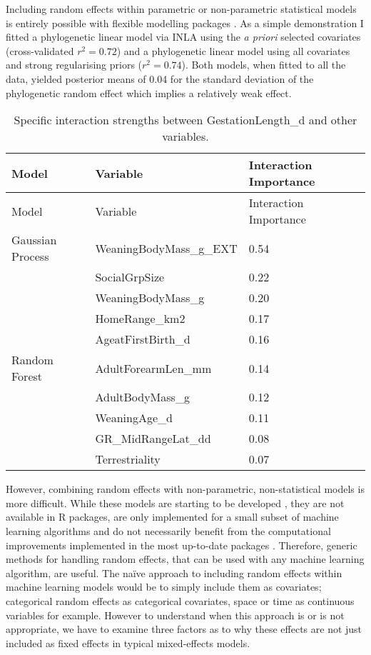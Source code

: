 \documentclass[10pt,]{article}
\begin{document}
Including random effects within parametric or non-parametric statistical models is entirely possible with flexible modelling packages \citep{stan, INLA, glmmTMB, tmb}. As a simple demonstration I fitted a phylogenetic linear model via INLA \citep{INLA} using the \emph{a priori} selected covariates (cross-validated \(r^2 = 0.72\)) and a phylogenetic linear model using all covariates and strong regularising priors (\(r^2 = 0.74\)). Both models, when fitted to all the data, yielded posterior means of 0.04 for the standard deviation of the phylogenetic random effect which implies a relatively weak effect.

\begin{table}[t!]
\begin{longtable}[c]{@{}lll@{}}
\caption{Specific interaction strengths between GestationLength\_d and other variables. \label{tbl:specificinter}}\tabularnewline
\toprule
Model & Variable & Interaction Importance\tabularnewline
\midrule
\endfirsthead
\toprule
Model & Variable & Interaction Importance\tabularnewline
\midrule
\endhead
Gaussian Process & WeaningBodyMass\_g\_EXT & 0.54\tabularnewline
& SocialGrpSize & 0.22\tabularnewline
& WeaningBodyMass\_g & 0.20\tabularnewline
& HomeRange\_km2 & 0.17\tabularnewline
& AgeatFirstBirth\_d & 0.16\tabularnewline
Random Forest & AdultForearmLen\_mm & 0.14\tabularnewline
& AdultBodyMass\_g & 0.12\tabularnewline
& WeaningAge\_d & 0.11\tabularnewline
& GR\_MidRangeLat\_dd & 0.08\tabularnewline
& Terrestriality & 0.07\tabularnewline
\bottomrule
\end{longtable}
\end{table}
  

However, combining random effects with non-parametric, non-statistical models is more difficult. While these models are starting to be developed \citep{ngufor2019mixed, hajjem2014mixed, hajjem2017generalized, eo2014tree, miller2017gradient, REEMtree}, they are not available in R packages, are only implemented for a small subset of machine learning algorithms and do not necessarily benefit from the computational improvements implemented in the most up-to-date packages \citep{wright2015ranger, xgboost}. Therefore, generic methods for handling random effects, that can be used with any machine learning algorithm, are useful. The naïve approach to including random effects within machine learning models would be to simply include them as covariates; categorical random effects as categorical covariates, space or time as continuous variables for example. However to understand when this approach is or is not appropriate, we have to examine three factors as to why these effects are not just included as fixed effects in typical mixed-effects models.
\end{document}
